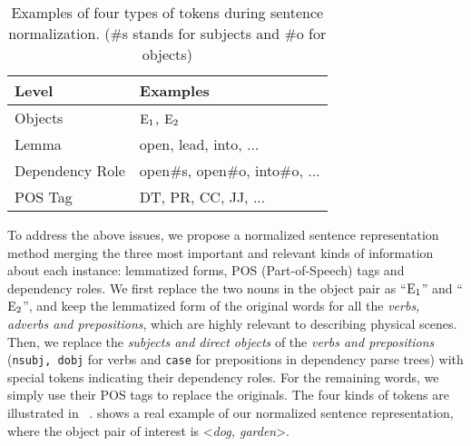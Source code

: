 \begin{table}[t]
	\centering
	\begin{tabular}{l|l}
		\hline
		\textbf{Level}	&  \textbf{Examples}\\ 		\hline
		Objects	& $\textnormal{E}_1$, $\textnormal{E}_2$ \\ 		\hline
		Lemma & open, lead, into, ...\\ \hline 
		Dependency Role	& open\#s, open\#o, into\#o, ... \\ 		\hline 
		POS Tag	& DT, PR, CC, JJ, ... \\ 	\hline 
	\end{tabular}
	\caption{Examples of four types of tokens during sentence normalization. (\#s stands for subjects and \#o for objects)}
	\label{tab:norm}
\end{table}

To address the above issues, we propose a normalized sentence representation method merging the three most important and relevant kinds of information about each instance: lemmatized forms, POS (Part-of-Speech) tags and dependency roles. 
We first replace the two nouns in the object pair as ``$\textnormal{E}_1$'' and ``$\textnormal{E}_2$'', and keep the lemmatized form of the original words for all the \textit{verbs, adverbs and prepositions}, which are highly relevant to describing physical scenes.
Then, we replace the \textit{subjects and direct objects} of the \textit{verbs and prepositions} (\texttt{nsubj, dobj} for verbs and \texttt{case} for prepositions in dependency parse trees) with special tokens indicating their dependency roles. 
For the remaining words, we simply use their POS tags to replace the originals. 
The four kinds of tokens are illustrated in ~.
 shows a real example of our normalized sentence representation, where the object pair of interest is \textless \textit{dog, garden}\textgreater. 

